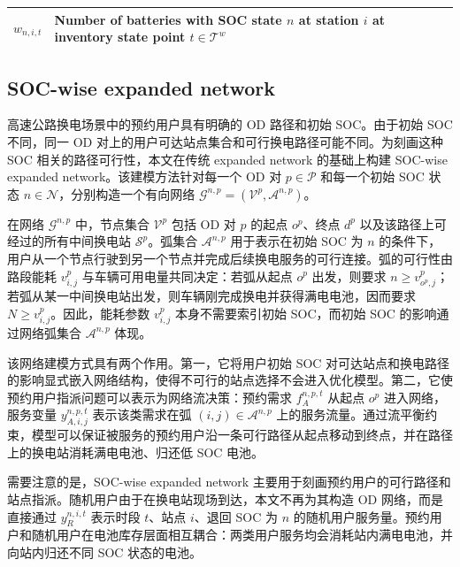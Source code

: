 \documentclass[12pt,hyperref,a4paper,UTF8]{ctexart}
\begin{document}
\begin{table}[!htbp]
\begin{tabular}{@{}lp{13cm}@{}}
    $w_{n,i,t}$ & Number of batteries with SOC state $n$ at station $i$ at inventory state point $t\in\mathcal{T}^{w}$ \\
    \bottomrule
  \end{tabular}
\end{table}

\subsection{SOC-wise expanded network}

高速公路换电场景中的预约用户具有明确的 OD 路径和初始 SOC。由于初始 SOC 不同，同一 OD 对上的用户可达站点集合和可行换电路径可能不同。为刻画这种 SOC 相关的路径可行性，本文在传统 expanded network 的基础上构建 SOC-wise expanded network。该建模方法针对每一个 OD 对 $p\in\mathcal{P}$ 和每一个初始 SOC 状态 $n\in\mathcal{N}$，分别构造一个有向网络 $\mathcal{G}^{n,p}=(\mathcal{V}^{p},\mathcal{A}^{n,p})$。

在网络 $\mathcal{G}^{n,p}$ 中，节点集合 $\mathcal{V}^{p}$ 包括 OD 对 $p$ 的起点 $o^p$、终点 $d^p$ 以及该路径上可经过的所有中间换电站 $\mathcal{S}^{p}$。弧集合 $\mathcal{A}^{n,p}$ 用于表示在初始 SOC 为 $n$ 的条件下，用户从一个节点行驶到另一个节点并完成后续换电服务的可行连接。弧的可行性由路段能耗 $v^p_{i,j}$ 与车辆可用电量共同决定：若弧从起点 $o^p$ 出发，则要求 $n\ge v^p_{o^p,j}$；若弧从某一中间换电站出发，则车辆刚完成换电并获得满电电池，因而要求 $N\ge v^p_{i,j}$。因此，能耗参数 $v^p_{i,j}$ 本身不需要索引初始 SOC，而初始 SOC 的影响通过网络弧集合 $\mathcal{A}^{n,p}$ 体现。

该网络建模方式具有两个作用。第一，它将用户初始 SOC 对可达站点和换电路径的影响显式嵌入网络结构，使得不可行的站点选择不会进入优化模型。第二，它使预约用户指派问题可以表示为网络流决策：预约需求 $f_A^{n,p,t}$ 从起点 $o^p$ 进入网络，服务变量 $y_{A,i,j}^{n,p,t}$ 表示该类需求在弧 $(i,j)\in\mathcal{A}^{n,p}$ 上的服务流量。通过流平衡约束，模型可以保证被服务的预约用户沿一条可行路径从起点移动到终点，并在路径上的换电站消耗满电电池、归还低 SOC 电池。

需要注意的是，SOC-wise expanded network 主要用于刻画预约用户的可行路径和站点指派。随机用户由于在换电站现场到达，本文不再为其构造 OD 网络，而是直接通过 $y_R^{n,i,t}$ 表示时段 $t$、站点 $i$、退回 SOC 为 $n$ 的随机用户服务量。预约用户和随机用户在电池库存层面相互耦合：两类用户服务均会消耗站内满电电池，并向站内归还不同 SOC 状态的电池。
\end{document}
